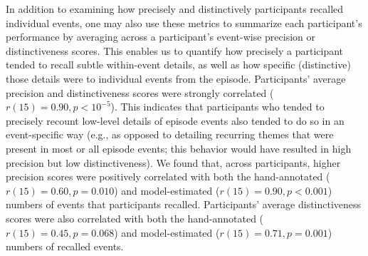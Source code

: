 \documentclass[10pt]{article}
\begin{document}
In addition to examining how precisely and distinctively participants recalled individual events, one may also use these metrics to summarize each participant's performance by averaging across a participant's event-wise precision or distinctiveness scores.  This enables us to quantify how precisely a participant tended to recall subtle within-event details, as well as how specific (distinctive) those details were to individual events from the episode.  Participants' average precision and distinctiveness scores were strongly correlated ($r(15) = 0.90, p < 10^{-5}$).  This indicates that participants who tended to precisely recount low-level details of episode events also tended to do so in an event-specific way (e.g., as opposed to detailing recurring themes that were present in most or all episode events; this behavior would have resulted in high precision but low distinctiveness).  We found that, across participants, higher precision scores were positively correlated with both the hand-annotated ($r(15) = 0.60, p = 0.010$) and model-estimated ($r(15) = 0.90, p < 0.001$) numbers of events that participants recalled.  Participants' average distinctiveness scores were also correlated with both the hand-annotated ($r(15) = 0.45, p = 0.068$) and model-estimated ($r(15) = 0.71, p = 0.001$) numbers of recalled events.
\end{document}
